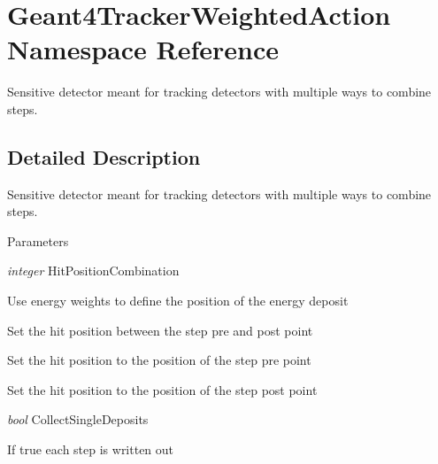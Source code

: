 \hypertarget{namespace_geant4_tracker_weighted_action}{
\section{Geant4TrackerWeightedAction Namespace Reference}
\label{namespace_geant4_tracker_weighted_action}
}


Sensitive detector meant for tracking detectors with multiple ways to combine steps.  


\subsection{Detailed Description}
Sensitive detector meant for tracking detectors with multiple ways to combine steps. 
\begin{DoxyParams}{Parameters}
\item[{\em integer}]HitPositionCombination
\begin{DoxyEnumerate}
\item Use energy weights to define the position of the energy deposit
\item Set the hit position between the step pre and post point
\item Set the hit position to the position of the step pre point
\item Set the hit position to the position of the step post point
\end{DoxyEnumerate}\item[{\em bool}]CollectSingleDeposits
\begin{DoxyItemize}
\item If true each step is written out 
\end{DoxyItemize}\end{DoxyParams}
